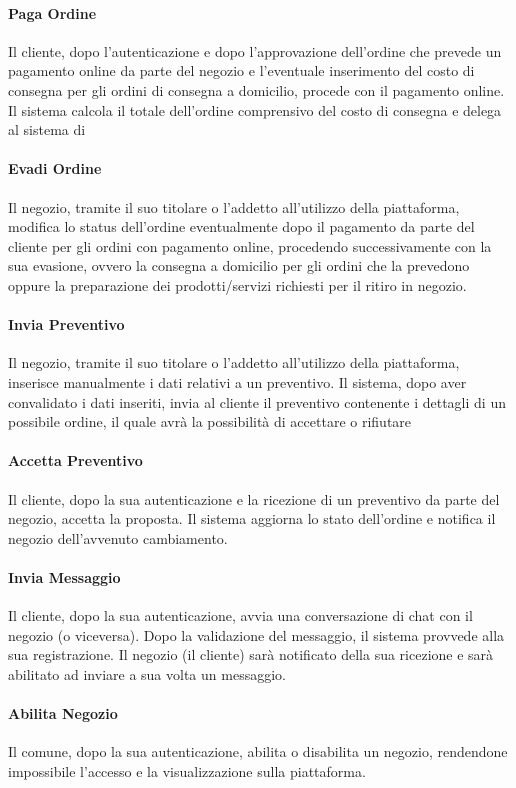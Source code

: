 \paragraph{Paga Ordine} Il cliente, dopo l'autenticazione e dopo l'approvazione dell'ordine che prevede un pagamento online da parte del negozio e l'eventuale inserimento del costo di consegna per gli ordini di consegna a domicilio, procede con il pagamento online. Il sistema calcola il totale dell'ordine comprensivo del costo di consegna e delega al sistema di 
\paragraph{Evadi Ordine} Il negozio, tramite il suo titolare o l'addetto all'utilizzo della piattaforma, modifica lo status dell'ordine eventualmente dopo il pagamento da parte del cliente per gli ordini con pagamento online, procedendo successivamente con la sua evasione, ovvero la consegna a domicilio per gli ordini che la prevedono oppure la preparazione dei prodotti/servizi richiesti per il ritiro in negozio.
\paragraph{Invia Preventivo} Il negozio, tramite il suo titolare o l'addetto all'utilizzo della piattaforma, inserisce manualmente i dati relativi a un preventivo. Il sistema, dopo aver convalidato i dati inseriti, invia al cliente il preventivo contenente i dettagli di un possibile ordine, il quale avrà la possibilità di accettare o rifiutare
\paragraph{Accetta Preventivo} Il cliente, dopo la sua autenticazione e la ricezione di un preventivo da parte del negozio, accetta la proposta. Il sistema aggiorna lo stato dell'ordine e notifica il negozio dell'avvenuto cambiamento.
\paragraph{Invia Messaggio} Il cliente, dopo la sua autenticazione, avvia una conversazione di chat con il negozio (o viceversa). Dopo la validazione del messaggio, il sistema provvede alla sua registrazione. Il negozio (il cliente) sarà notificato della sua ricezione e sarà abilitato ad inviare a sua volta un messaggio.
\paragraph{Abilita Negozio} Il comune, dopo la sua autenticazione, abilita o disabilita un negozio, rendendone impossibile l'accesso e la visualizzazione sulla piattaforma.

